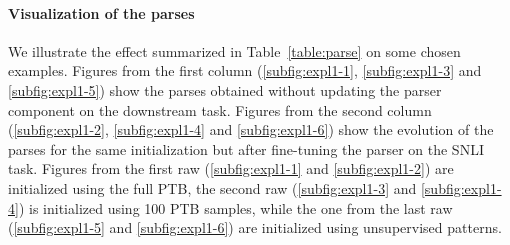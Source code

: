 \paragraph{Visualization of the parses} We illustrate the effect summarized in Table~\ref{table:parse} on some chosen examples. Figures from the first column (\ref{subfig:expl1-1}, \ref{subfig:expl1-3} and \ref{subfig:expl1-5}) show the parses obtained without updating the parser component on the downstream task. Figures from the second column (\ref{subfig:expl1-2}, \ref{subfig:expl1-4} and \ref{subfig:expl1-6}) show the evolution of the parses for the same initialization but after fine-tuning the parser on the SNLI task. Figures from the first raw (\ref{subfig:expl1-1} and \ref{subfig:expl1-2}) are initialized using the full PTB, the second raw (\ref{subfig:expl1-3} and \ref{subfig:expl1-4}) is initialized using 100 PTB samples, while the one from the last raw (\ref{subfig:expl1-5} and \ref{subfig:expl1-6}) are initialized using unsupervised patterns.


